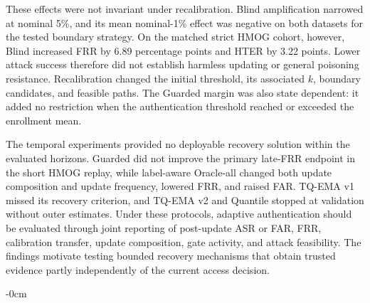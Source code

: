 \documentclass[technologies,article,submit,moreauthors]{Definitions/mdpi}
\begin{document}
These effects were not invariant under recalibration. Blind amplification narrowed at nominal 5\%, and its mean nominal-1\% effect was negative on both datasets for the tested boundary strategy. On the matched strict HMOG cohort, however, Blind increased FRR by 6.89 percentage points and HTER by 3.22 points. Lower attack success therefore did not establish harmless updating or general poisoning resistance. Recalibration changed the initial threshold, its associated \(k\), boundary candidates, and feasible paths. The Guarded margin was also state dependent: it added no restriction when the authentication threshold reached or exceeded the enrollment mean.

The temporal experiments provided no deployable recovery solution within the evaluated horizons. Guarded did not improve the primary late-FRR endpoint in the short HMOG replay, while label-aware Oracle-all changed both update composition and update frequency, lowered FRR, and raised FAR. TQ-EMA v1 missed its recovery criterion, and TQ-EMA v2 and Quantile stopped at validation without outer estimates. Under these protocols, adaptive authentication should be evaluated through joint reporting of post-update ASR or FAR, FRR, calibration transfer, update composition, gate activity, and attack feasibility. The findings motivate testing bounded recovery mechanisms that obtain trusted evidence partly independently of the current access decision.




\begin{adjustwidth}{-\extralength}{0cm}

\end{adjustwidth}
\end{document}
